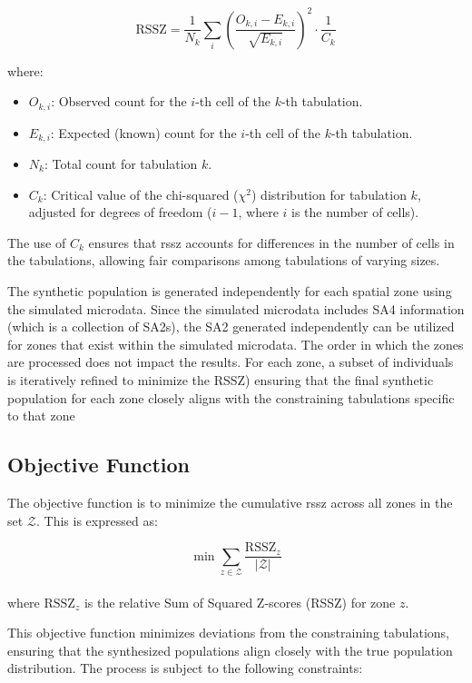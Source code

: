 \[
\text{RSSZ} = \frac{1}{N_k} \sum_{i} \left( \frac{O_{k,i} - E_{k,i}}{\sqrt{E_{k,i}}} \right)^2 \cdot \frac{1}{C_k}
\]

where:
\begin{itemize}
\item \( O_{k,i} \): Observed count for the \( i \)-th cell of the \( k \)-th tabulation.
\item \( E_{k,i} \): Expected (known) count for the \( i \)-th cell of the \( k \)-th tabulation.
\item \( N_k \): Total count for tabulation \( k \).
\item \( C_k \): Critical value of the chi-squared (\( \chi^2 \)) distribution for tabulation \( k \), adjusted for degrees of freedom (\( i-1 \), where \( i \) is the number of cells).

\end{itemize}
The use of \( C_k \) ensures that \gls{rssz} accounts for differences in the number of cells in the tabulations, allowing fair comparisons among tabulations of varying sizes.

The synthetic population is generated independently for each spatial zone using the simulated microdata. Since the simulated microdata includes SA4 information (which is a collection of SA2s), the SA2 generated independently can be utilized for zones that exist within the simulated microdata. The order in which the zones are processed does not impact the results. For each zone, a subset of individuals is iteratively refined to minimize the RSSZ) ensuring that the final synthetic population for each zone closely aligns with the constraining tabulations specific to that zone

\subsection*{Objective Function}
The objective function is to minimize the cumulative \gls{rssz} across all zones in the set \( \mathcal{Z} \). This is expressed as:

\[
\min \sum_{z \in \mathcal{Z}} \frac{\text{RSSZ}_z}{| \mathcal{Z} |}
\]
\\
where \( \text{RSSZ}_z \) is the relative Sum of Squared Z-scores (RSSZ) for zone \( z \).

This objective function minimizes deviations from the constraining tabulations, ensuring that the synthesized populations align closely with the true population distribution. The process is subject to the following constraints:

